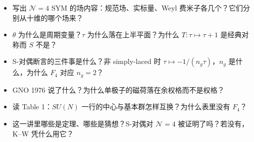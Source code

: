 \begin{checkbox}
\begin{itemize}
\item 写出 $\mathcal N=4$ SYM 的场内容：规范场、实标量、Weyl 费米子各几个？它们分别从十维的哪个场来？
\item $\theta$ 为什么是周期变量？$\tau$ 为什么落在上半平面？为什么 $T:\tau\mapsto\tau+1$ 是经典对称而 $S$ 不是？
\item S-对偶断言的三件事是什么？非 simply-laced 时 $\tau\mapsto-1/(n_g\tau)$，$n_g$ 是什么，为什么 $F_4$ 对应 $n_g=2$？
\item GNO 1976 说了什么？为什么单极子的磁荷落在余权格而不是权格？
\item 读 Table 1：$SU(N)$ 一行的中心与基本群怎样互换？为什么表里没有 $F_4$？
\item 这一讲里哪些是定理、哪些是猜想？S-对偶对 $\mathcal N=4$ 被证明了吗？若没有，K--W 凭什么用它？
\end{itemize}
\end{checkbox}
